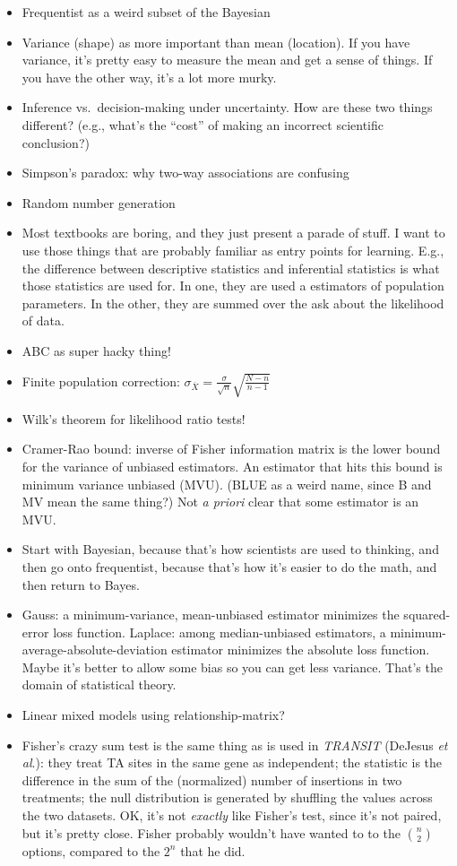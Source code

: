 \documentclass{book}
\begin{document}
\begin{itemize}
\item
  Frequentist as a weird subset of the Bayesian
\item
  Variance (shape) as more important than mean (location). If you have
  variance, it's pretty easy to measure the mean and get a sense of
  things. If you have the other way, it's a lot more murky.
\item
  Inference vs.~decision-making under uncertainty. How are these two
  things different? (e.g., what's the ``cost'' of making an incorrect
  scientific conclusion?)
\item
  Simpson's paradox: why two-way associations are confusing
\item
  Random number generation
\item
  Most textbooks are boring, and they just present a parade of stuff. I
  want to use those things that are probably familiar as entry points
  for learning. E.g., the difference between descriptive statistics and
  inferential statistics is what those statistics are used for. In one,
  they are used a estimators of population parameters. In the other,
  they are summed over the ask about the likelihood of data.
\item
  ABC as super hacky thing!
\item
  Finite population correction:
  \(\sigma_{\overline{X}} = \frac{\sigma}{\sqrt{n}} \sqrt{\frac{N - n}{n - 1}}\)
\item
  Wilk's theorem for likelihood ratio tests!
\item
  Cramer-Rao bound: inverse of Fisher information matrix is the lower
  bound for the variance of unbiased estimators. An estimator that hits
  this bound is minimum variance unbiased (MVU). (BLUE as a weird name,
  since B and MV mean the same thing?) Not \emph{a priori} clear that
  some estimator is an MVU.
\item
  Start with Bayesian, because that's how scientists are used to
  thinking, and then go onto frequentist, because that's how it's easier
  to do the math, and then return to Bayes.
\item
  Gauss: a minimum-variance, mean-unbiased estimator minimizes the
  squared-error loss function. Laplace: among median-unbiased
  estimators, a minimum-average-absolute-deviation estimator minimizes
  the absolute loss function. Maybe it's better to allow some bias so
  you can get less variance. That's the domain of statistical theory.
\item
  Linear mixed models using relationship-matrix?
\item
  Fisher's crazy sum test is the same thing as is used in \emph{TRANSIT}
  (DeJesus \emph{et al}.): they treat TA sites in the same gene as
  independent; the statistic is the difference in the sum of the
  (normalized) number of insertions in two treatments; the null
  distribution is generated by shuffling the values across the two
  datasets. OK, it's not \emph{exactly} like Fisher's test, since it's
  not paired, but it's pretty close. Fisher probably wouldn't have
  wanted to to the \(\binom{n}{2}\) options, compared to the \(2^n\)
  that he did.
\end{itemize}
\end{document}
